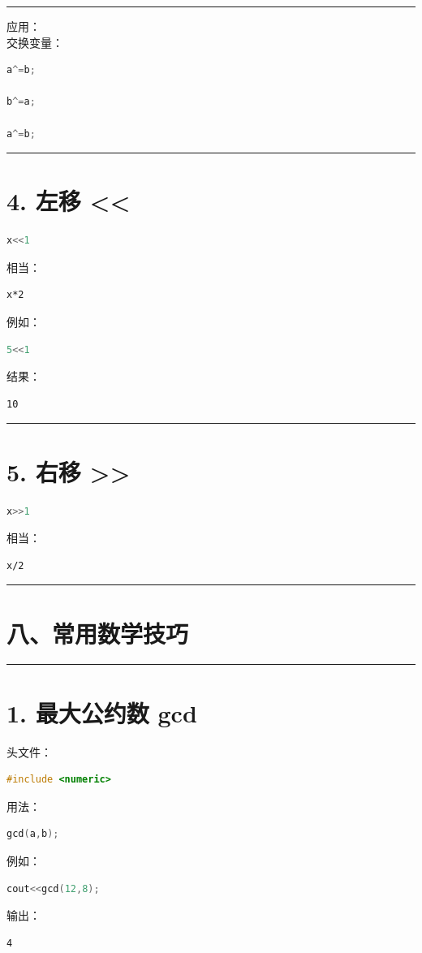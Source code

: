 \documentclass[10pt,twocolumn]{extarticle}
\begin{document}
\noindent\rule{\linewidth}{0.4pt}

应用：\\
交换变量：
\begin{lstlisting}[language=C++]
a^=b;

b^=a;

a^=b;
\end{lstlisting}

\noindent\rule{\linewidth}{0.4pt}

\section{4. 左移 <<}
\begin{lstlisting}[language=C++]
x<<1
\end{lstlisting}
相当：
\begin{lstlisting}
x*2
\end{lstlisting}
例如：
\begin{lstlisting}[language=C++]
5<<1
\end{lstlisting}
结果：
\begin{lstlisting}
10
\end{lstlisting}

\noindent\rule{\linewidth}{0.4pt}

\section{5. 右移 >>}
\begin{lstlisting}[language=C++]
x>>1
\end{lstlisting}
相当：
\begin{lstlisting}
x/2
\end{lstlisting}

\noindent\rule{\linewidth}{0.4pt}

\section{八、常用数学技巧}

\noindent\rule{\linewidth}{0.4pt}

\section{1. 最大公约数 gcd}

头文件：
\begin{lstlisting}[language=C++]
#include <numeric>
\end{lstlisting}
用法：
\begin{lstlisting}[language=C++]
gcd(a,b);
\end{lstlisting}
例如：
\begin{lstlisting}[language=C++]
cout<<gcd(12,8);
\end{lstlisting}
输出：
\begin{lstlisting}
4
\end{lstlisting}
\end{document}
